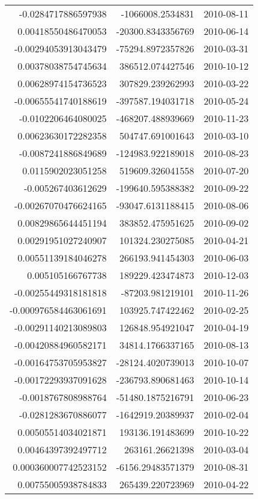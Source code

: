 \begin{tabular}{r | r | l}
-0.0284717886597938 & -1066008.2534831 & 2010-08-11 \\
0.00418550486470053 & -20300.8343356769 & 2010-06-14 \\
-0.00294053913043479 & -75294.8972357826 & 2010-03-31 \\
0.00378038754745634 & 386512.074427546 & 2010-10-12 \\
0.00628974154736523 & 307829.239262993 & 2010-03-22 \\
-0.00655541740188619 & -397587.194031718 & 2010-05-24 \\
-0.0102206464080025 & -468207.488939669 & 2010-11-23 \\
0.00623630172282358 & 504747.691001643 & 2010-03-10 \\
-0.0087241886849689 & -124983.922189018 & 2010-08-23 \\
0.0115902023051258 & 519609.326041558 & 2010-07-20 \\
-0.005267403612629 & -199640.595388382 & 2010-09-22 \\
-0.00267070476624165 & -93047.6131188415 & 2010-08-06 \\
0.00829865644451194 & 383852.475951625 & 2010-09-02 \\
0.00291951027240907 & 101324.230275085 & 2010-04-21 \\
0.00551139184046278 & 266193.941454303 & 2010-06-03 \\
0.005105166767738 & 189229.423474873 & 2010-12-03 \\
-0.00255449318181818 & -87203.981219101 & 2010-11-26 \\
-0.000976584463061691 & 103925.747422462 & 2010-02-25 \\
-0.00291140213089803 & 126848.954921047 & 2010-04-19 \\
-0.00420884960582171 & 34814.1766337165 & 2010-08-13 \\
-0.00164753705953827 & -28124.4020739013 & 2010-10-07 \\
-0.00172293937091628 & -236793.890681463 & 2010-10-14 \\
-0.0018767808988764 & -51480.1875216791 & 2010-06-23 \\
-0.0281283670886077 & -1642919.20389937 & 2010-02-04 \\
0.00505514034021871 & 193136.191483699 & 2010-10-22 \\
0.00464397392497712 & 263161.26621398 & 2010-03-04 \\
0.000360007742523152 & -6156.29483571379 & 2010-08-31 \\
0.00755005938784833 & 265439.220723969 & 2010-04-22 \\

\end{tabular}
